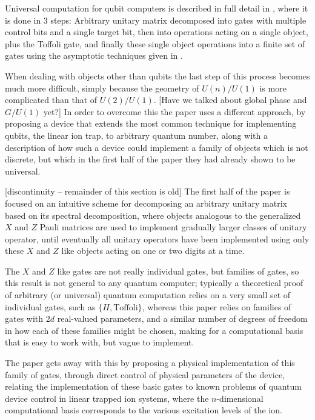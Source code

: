 Universal computation for qubit computers is described in full detail in \cite{textbook}, where it is done in 3 steps: Arbitrary unitary matrix decomposed into gates with multiple control bits and a single target bit, then into operations acting on a single object, plus the Toffoli gate, and finally these single object operations into a finite set of gates using the asymptotic techniques given in \cite{universal-qubit}.

When dealing with objects other than qubits the last step of this process becomes much more difficult, simply because the geometry of $U(n)/U(1)$ is more complicated than that of $U(2)/U(1)$. [Have we talked about global phase and $G/U(1)$ yet?] In order to overcome this the paper \cite{multi-valued-logic} uses a different approach, by proposing a device that extends the most common technique for implementing qubits, the linear ion trap, to arbitrary quantum number, along with a description of how such a device could implement a family of objects which is not discrete, but which in the first half of the paper they had already shown to be universal.

[discontinuity -- remainder of this section is old] The first half of the paper is focused on an intuitive scheme for decomposing an arbitrary unitary matrix based on its spectral decomposition, where objects analogous to the generalized $X$ and $Z$ Pauli matrices are used to implement gradually larger classes of unitary operator, until eventually all unitary operators have been implemented using only these $X$ and $Z$ like objects acting on one or two digits at a time.

The $X$ and $Z$ like gates are not really individual gates, but families of gates, so this result is not general to any quantum computer; typically a theoretical proof of arbitrary (or universal) quantum computation relies on a very small set of individual gates, such as $\{H, \text{Toffoli}\}$, whereas this paper relies on families of gates with $2d$ real-valued parameters, and a similar number of degrees of freedom in how each of these families might be chosen, making for a computational basis that is easy to work with, but vague to implement.

The paper gets away with this by proposing a physical implementation of this family of gates, through direct control of physical parameters of the device, relating the implementation of these basic gates to known problems of quantum device control in linear trapped ion systems, where the $n$-dimensional computational basis corresponds to the various excitation levels of the ion.

